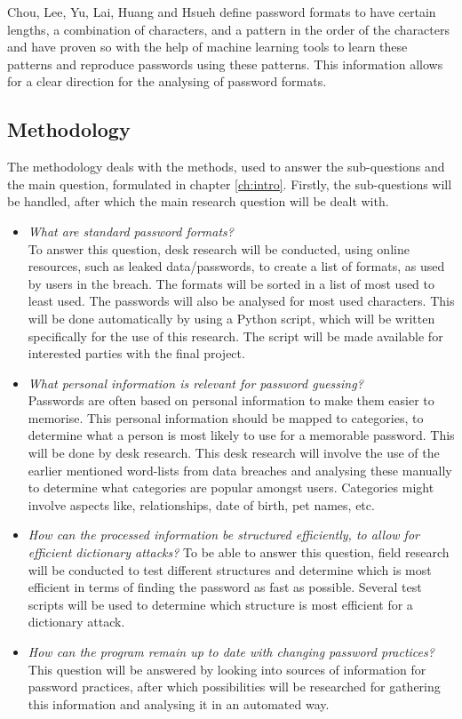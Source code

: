 \documentclass[a4paper,12pt]{article}
\begin{document}
Chou, Lee, Yu, Lai, Huang and Hsueh \cite{bib:pform} define password formats to have certain lengths, a combination of characters, and a pattern in the order of the characters and have proven so with the help of machine learning tools to learn these patterns and reproduce passwords using these patterns. This information allows for a clear direction for the analysing of password formats.

\subsection{Methodology}
The methodology deals with the methods, used to answer the sub-questions and the main question, formulated in chapter \ref{ch:intro}. Firstly, the sub-questions will be handled, after which the main research question will be dealt with.

\begin{itemize}
\item \textit{What are standard password formats?}\\
  To answer this question, desk research will be conducted, using online resources, such as leaked data/passwords, to create a list of formats, as used by users in the breach. The formats will be sorted in a list of most used to least used. The passwords will also be analysed for most used characters. This will be done automatically by using a Python script, which will be written specifically for the use of this research. The script will be made available for interested parties with the final project.
  
\item \textit{What personal information is relevant for password guessing?}\\
  Passwords are often based on personal information to make them easier to memorise. This personal information should be mapped to categories, to determine what a person is most likely to use for a memorable password. This will be done by desk research. This desk research will involve the use of the earlier mentioned word-lists from data breaches and analysing these manually to determine what categories are popular amongst users. Categories might involve aspects like, relationships, date of birth, pet names, etc.
  
\item \textit{How can the processed information be structured efficiently, to allow for efficient dictionary attacks?}
  To be able to answer this question, field research will be conducted to test different structures and determine which is most efficient in terms of finding the password as fast as possible. Several test scripts will be used to determine which structure is most efficient for a dictionary attack.

\item \textit{How can the program remain up to date with changing password practices?}
  This question will be answered by looking into sources of information for password practices, after which possibilities will be researched for gathering this information and analysing it in an automated way.
\end{itemize}
\end{document}

